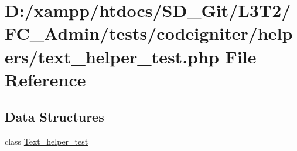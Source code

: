 \hypertarget{_admin_2tests_2codeigniter_2helpers_2text__helper__test_8php}{}\section{D\+:/xampp/htdocs/\+S\+D\+\_\+\+Git/\+L3\+T2/\+F\+C\+\_\+\+Admin/tests/codeigniter/helpers/text\+\_\+helper\+\_\+test.php File Reference}
\label{_admin_2tests_2codeigniter_2helpers_2text__helper__test_8php}
\subsection*{Data Structures}
\begin{DoxyCompactItemize}
\item 
class \hyperlink{class_text__helper__test}{Text\+\_\+helper\+\_\+test}
\end{DoxyCompactItemize}
